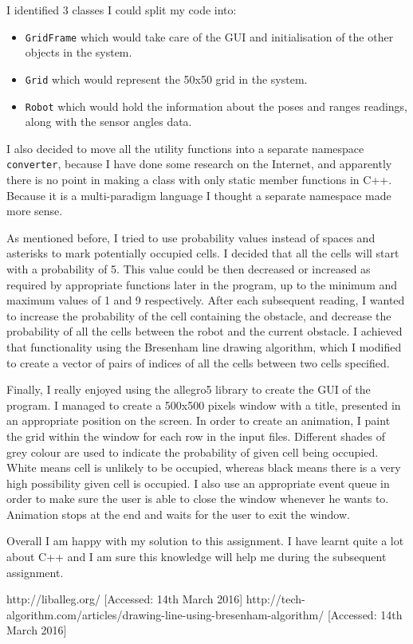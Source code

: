\documentclass[a4paper, 12pt]{article}
\begin{document}
I identified 3 classes I could split my code into:
\begin{itemize}
	\item \texttt{GridFrame} which would take care of the GUI and initialisation
		of the other objects in the system.
	\item \texttt{Grid} which would represent the 50x50 grid in the system.
	\item \texttt{Robot} which would hold the information about the poses and 
		ranges readings, along with the sensor angles data.
\end{itemize}

I also decided to move all the utility functions into a separate namespace
\texttt{converter}, because I have done some research on the Internet, and 
apparently there is no point in making a class with only static member
functions in C++. Because it is a multi-paradigm language I thought a separate
namespace made more sense. 

As mentioned before, I tried to use probability values instead of spaces and 
asterisks to mark potentially occupied cells. I decided that all the cells will
start with a probability of 5. This value could be then decreased or increased 
as required by appropriate functions later in the program, up to the minimum
and maximum values of 1 and 9 respectively. After each subsequent reading, I
wanted to increase the probability of the cell containing the obstacle, and decrease
the probability of all the cells between the robot and the current obstacle. 
I achieved that functionality using the Bresenham line drawing algorithm\cite{2}, which
I modified to create a vector of pairs of indices of all the cells between
two cells specified.

Finally, I really enjoyed using the allegro5 library to create the GUI of the 
program. I managed to create a 500x500 pixels window with a title, presented
in an appropriate position on the screen. In order to create an animation, I
paint the grid within the window for each row in the input files. Different 
shades of grey colour are used to indicate the probability of given cell being
occupied. White means cell is unlikely to be occupied, whereas black means there
is a very high possibility given cell is occupied. I also use an appropriate
event queue in order to make sure the user is able to close the window whenever
he wants to. Animation stops at the end and waits for the user to exit the
window.  

Overall I am happy with my solution to this assignment. I have learnt quite
a lot about C++ and I am sure this knowledge will help me during the subsequent
assignment.

\newpage
{}
\begin{thebibliography}{2}
 http://liballeg.org/ [Accessed: 14th March 2016]
 http://tech-algorithm.com/articles/drawing-line-using-bresenham-algorithm/ [Accessed: 14th March 2016]

\end{thebibliography}
\end{document}
